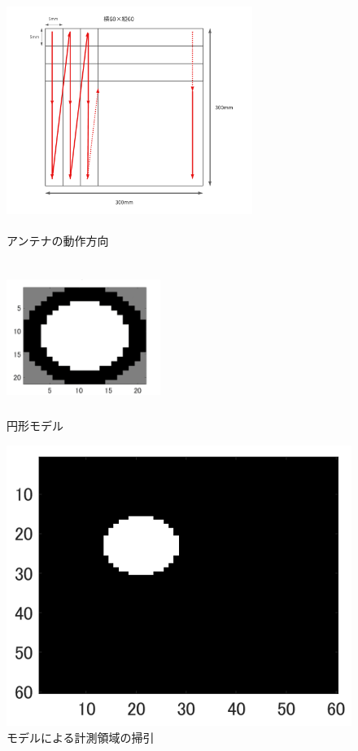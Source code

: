 \documentclass[12pt,a4paper]{jsreport}
\begin{document}
    \begin{figure}[htbp]
      \begin{minipage}[b]{0.45\linewidth}
        \centering
        \includegraphics[height=7cm,width=8cm]{./image/sweep.pdf}
        \caption{アンテナの動作方向}\label{アンテナの動作方向}
      \end{minipage}
      \begin{minipage}[b]{0.45\linewidth}
        \centering
        \includegraphics[height=5cm,width=5cm]{./slide_image/spheremodel1.png}
        \caption{円形モデル}\label{円形モデル}
      \end{minipage}
    \end{figure}

    \begin{figure}[h]
      \begin{center}
          \includegraphics[width=12cm]{./slide_image/spheremodel2.png}
          \caption{モデルによる計測領域の掃引}\label{モデルによる計測領域の掃引}
      \end{center}
    \end{figure}
    
\end{document}
